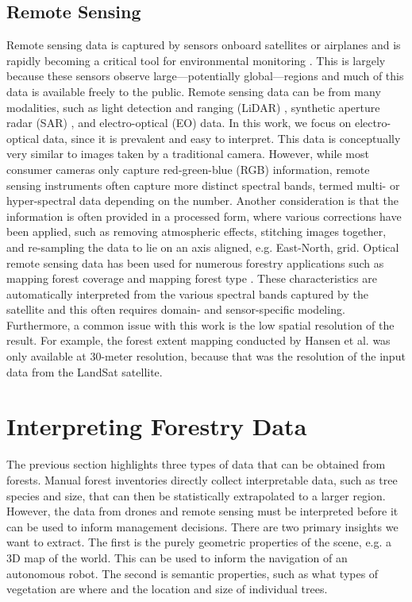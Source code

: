 \subsection{Remote Sensing}
Remote sensing data is captured by sensors onboard satellites or airplanes and is rapidly becoming a critical tool for environmental monitoring \cite{Parra2022RemoteMonitoring}. This is largely because these sensors observe large---potentially global---regions and much of this data is available freely to the public. 
Remote sensing data can be from many modalities, such as light detection and ranging (LiDAR) \cite{LiDARForestryBeland2019}, synthetic aperture radar (SAR) \cite{Hall2020WhatEarthdata}, and electro-optical (EO) data.
In this work, we focus on electro-optical data, since it is prevalent and easy to interpret. This data is conceptually very similar to images taken by a traditional camera. However, while most consumer cameras only capture red-green-blue (RGB) information, remote sensing instruments often capture more distinct spectral bands, termed multi- or hyper-spectral data depending on the number. Another consideration is that the information is often provided in a processed form, where various corrections have been applied, such as removing atmospheric effects, stitching images together, and re-sampling the data to lie on an axis aligned, e.g. East-North, grid. 
Optical remote sensing data has been used for numerous forestry applications such as mapping forest coverage \cite{ Hansen2013High-resolutionChange} and mapping forest type \cite{Kempeneers2011DataMapping}. These characteristics are automatically interpreted from the various spectral bands captured by the satellite and this often requires domain- and sensor-specific modeling. Furthermore, a common issue with this work is the low spatial resolution of the result. For example, the forest extent mapping conducted by Hansen et al. \cite{Hansen2013High-resolutionChange} was only available at 30-meter resolution, because that was the resolution of the input data from the LandSat satellite.

\section{Interpreting Forestry Data}
The previous section highlights three types of data that can be obtained from forests. Manual forest inventories directly collect interpretable data, such as tree species and size, that can then be statistically extrapolated to a larger region. However, the data from drones and remote sensing must be interpreted before it can be used to inform management decisions. There are two primary insights we want to extract. The first is the purely geometric properties of the scene, e.g. a 3D map of the world. This can be used to inform the navigation of an autonomous robot. The second is semantic properties, such as what types of vegetation are where and the location and size of individual trees. 

